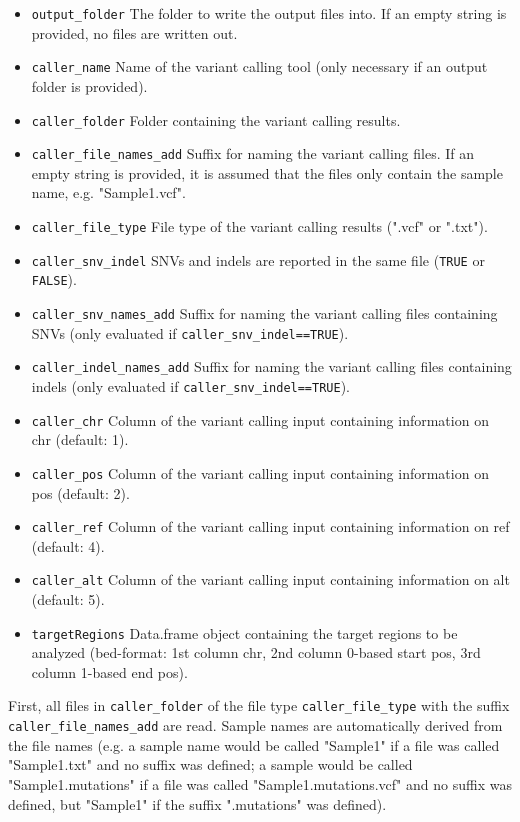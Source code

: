 \documentclass{article}
\begin{document}
\begin{itemize}
  \item \texttt{output\_folder} The folder to write the output files into. If an empty string is provided, no files are written out.
  \item \texttt{caller\_name} Name of the variant calling tool (only necessary if an output folder is provided).
  \item \texttt{caller\_folder} Folder containing the variant calling results.
  \item \texttt{caller\_file\_names\_add} Suffix for naming the variant calling files. If an empty string is provided, it is assumed that the files only contain the sample name, e.g. "Sample1.vcf".
  \item \texttt{caller\_file\_type} File type of the variant calling results (".vcf" or ".txt").
  \item \texttt{caller\_snv\_indel} SNVs and indels are reported in the same file (\texttt{TRUE} or \texttt{FALSE}).
  \item \texttt{caller\_snv\_names\_add} Suffix for naming the variant calling files containing SNVs (only evaluated if \texttt{caller\_snv\_indel==TRUE}).
  \item \texttt{caller\_indel\_names\_add} Suffix for naming the variant calling files containing indels (only evaluated if \texttt{caller\_snv\_indel==TRUE}).
  \item \texttt{caller\_chr} Column of the variant calling input containing information on chr (default: 1).
  \item \texttt{caller\_pos} Column of the variant calling input containing information on pos (default: 2).
  \item \texttt{caller\_ref} Column of the variant calling input containing information on ref (default: 4).
  \item \texttt{caller\_alt} Column of the variant calling input containing information on alt (default: 5).
  \item \texttt{targetRegions} Data.frame object containing the target regions to be analyzed (bed-format: 1st column chr, 2nd column 0-based start pos, 3rd column 1-based end pos).
\end{itemize}

First, all files in \texttt{caller\_folder} of the file type \texttt{caller\_file\_type} with the suffix \texttt{caller\_file\_names\_add} are read. Sample names are automatically derived from the file names (e.g. a sample name would be called "Sample1" if a file was called "Sample1.txt" and no suffix was defined; a sample would be called "Sample1.mutations" if a file was called "Sample1.mutations.vcf" and no suffix was defined, but "Sample1" if the suffix ".mutations" was defined).
\end{document}
